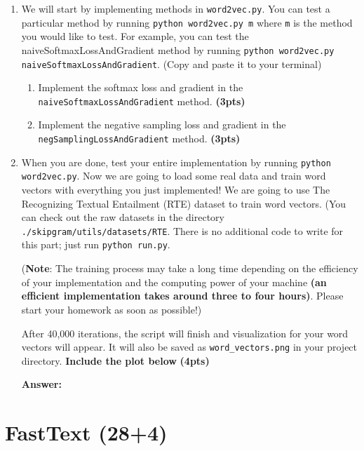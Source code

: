 \documentclass{assignment format}
\newenvironment{answer}{
    {\bf Answer:} \begingroup\color{red}
}{\endgroup}%
\begin{document}
\begin{enumerate}[label=(\alph*)]
    \item We will start by implementing methods in \texttt{word2vec.py}. You can test a particular method by running \texttt{python word2vec.py m} where \texttt{m} is the method you would like to test. For example, you can test the naiveSoftmaxLossAndGradient method by running \texttt{python word2vec.py naiveSoftmaxLossAndGradient}. (Copy and paste it to your terminal)
        \begin{enumerate}[label=(\roman*)]
        \item Implement the softmax loss and gradient in the \texttt{naiveSoftmaxLossAndGradient} method. \textbf{(3pts)}
        \item Implement the negative sampling loss and gradient in the \texttt{negSamplingLossAndGradient} method. \textbf{(3pts)}
    \end{enumerate}
    \item When you are done, test your entire implementation by running \texttt{python word2vec.py}. Now we are going to load some real data and train word vectors with everything you just implemented! We are going to use The Recognizing Textual Entailment (RTE) dataset to train word vectors. (You can check out the raw datasets in the directory \texttt{./skipgram/utils/datasets/RTE}. There is no additional code to write for this part; just run \texttt{python run.py}.

    (\textbf{Note}: The training process may take a long time depending on the efficiency of your implementation and the computing power of your machine \textbf{(an efficient implementation takes around three to four hours)}. Please start your homework as soon as possible!)

    After 40,000 iterations, the script will finish and visualization for your word vectors will appear. It will also be saved as \texttt{word\_vectors.png} in your project directory. \textbf{Include the plot below} \textbf{(4pts)}
    
    \begin{answer}

    \end{answer}
\end{enumerate}
\section{FastText (28+4)}
\end{document}
